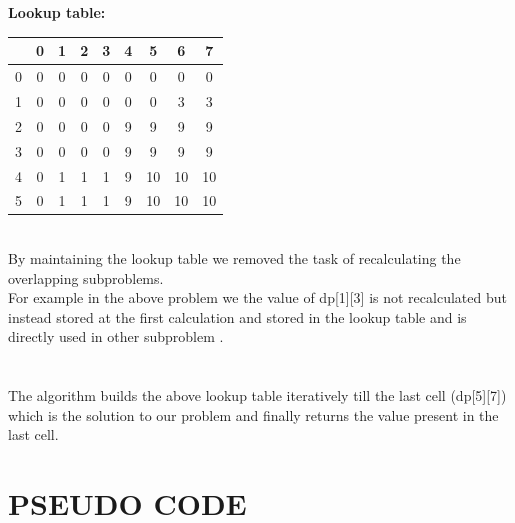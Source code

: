 \documentclass[twocolumn]{article}
\begin{document}
\vfill\eject
\\
\\
\textbf{ Lookup table:}\\





\begin{center}
	\begin{tabular}{ |c | c | c | c | c | c | c | c | c| }
	\hline
	  &0&1&2&3&4&5&6&7\\
	 \hline
	0&0&0&0&0&0&0&0&0\\
	\hline
	1&0&0&0&0&0&0&3&3\\
\hline
	2&0&0&0&0&9&9&9&9\\
\hline
	3&0&0&0&0&9&9&9&9\\
\hline
	4&0&1&1&1&9&10&10&10\\
\hline
	5&0&1&1&1&9&10&10&10\\
	\hline
	\end{tabular}
\end{center}



\noindent\\
By maintaining the lookup table we removed the task of recalculating the overlapping subproblems.\\
\noindent
For example in the above problem we the value of dp[1][3] is not recalculated but instead stored at the first calculation and stored in the lookup table and is directly used in other subproblem .\\
\\
\noindent\\
The algorithm builds the above lookup table iteratively till the last cell (dp[5][7]) which is the solution to our problem and finally returns the value present in the last cell.

\section*{PSEUDO CODE
}
\end{document}
